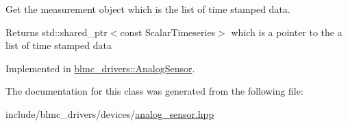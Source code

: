 Get the measurement object which is the list of time stamped data. 

\begin{DoxyReturn}{Returns}
std\+::shared\+\_\+ptr$<$const Scalar\+Timeseries$>$ which is a pointer to the a list of time stamped data 
\end{DoxyReturn}


Implemented in \hyperlink{classblmc__drivers_1_1AnalogSensor_ae6edd73f6625a940a05042bef9a4c264}{blmc\+\_\+drivers\+::\+Analog\+Sensor}.



The documentation for this class was generated from the following file\+:\begin{DoxyCompactItemize}
\item 
include/blmc\+\_\+drivers/devices/\hyperlink{analog__sensor_8hpp}{analog\+\_\+sensor.\+hpp}\end{DoxyCompactItemize}
